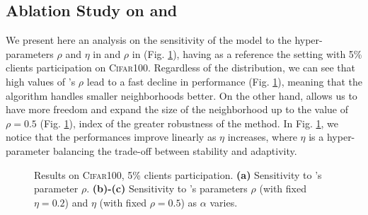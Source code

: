 \subsection{Ablation Study on \sam and \asam}
We present here an analysis on the sensitivity of the model to the hyper-parameters $\rho$ and $\eta$ in \asam and $\rho$ in \sam (Fig. \ref{fig:sensitivity}), having as a reference the setting with 5\% clients participation on \textsc{Cifar100}. Regardless of the distribution, we can see that high values of \sam's $\rho$ lead to a fast decline in performance (Fig. \ref{fig:sensitivity}{\color{red}{a}}), meaning that the algorithm handles smaller neighborhoods better. On the other hand, \asam allows us to have more freedom and expand the size of the neighborhood up to the value of $\rho=0.5$ (Fig. \ref{fig:sensitivity}{\color{red}{b}}), index of the greater robustness of the method. In Fig. \ref{fig:sensitivity}{\color{red}{c}}, we notice that the performances improve linearly as $\eta$ increases, where $\eta$ is a hyper-parameter balancing the trade-off between stability and adaptivity.

\captionsetup[subfloat]{font=scriptsize,labelformat=parens}
\begin{figure}[]
    \centering
    \caption{Results on \textsc{Cifar100}, 5\% clients participation. \textbf{(a)} Sensitivity to \sam's parameter $\rho$. \textbf{(b)-(c)} Sensitivity to \asam's parameters $\rho$ (with fixed $\eta=0.2$) and $\eta$ (with fixed $\rho=0.5$) as $\alpha$ varies.}
    \label{fig:sensitivity}
\end{figure}

